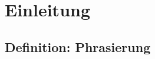 \chapter{Einleitung}
\label{chap:Einleitung}





\vspace{1cm}


\section{Definition: Phrasierung}

